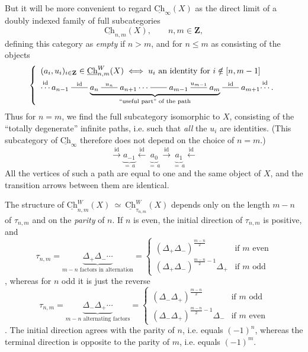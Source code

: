 \documentclass[11pt]{article}
\newcommand{\printedpage}[1]{\marginpar{\footnotesize p.~#1}}
\newcommand{\msp}[1]{\marginpar{\footnotesize [#1]}}
\newcommand{\Ch}{\underline{\mathrm{Ch}}}
\newcommand{\dashto}[1]{\mathrel{\overset{#1}{\rule[0.6ex]{2em}{0.4pt}}}}
\begin{document}
But it will be more convenient to regard $\Ch_{\infty}(X)$ as the direct limit of a
\msp{page 146}
doubly indexed family of full subcategories
\[
\Ch_{n,m}(X), \qquad n, m \in \mathbf{Z},
\]
defining this category as \textit{empty} if $n > m$, and for $n \leq m$ as consisting of the objects
\[
\left\{ \begin{array}{l}
(a_i, u_i)_{i \in \mathbf{Z}} \in \Ch^{W}_{n,m}(X) \iff u_i \text{ an identity for } i \notin [n, m-1] \\[1ex]
\overset{\mathrm{id}}{\cdots}\, a_{n-1} \dashto{\mathrm{id}} \underbrace{a_n \dashto{u_n} a_{n+1} \cdots \dashto{} a_{m-1} \dashto{u_{m-1}} a_m}_{\text{\scriptsize ``useful part'' of the path}} \dashto{\mathrm{id}} a_{m+1} \overset{\mathrm{id}}{\cdots}\,.
\end{array} \right.
\]
Thus for $n = m$, we find the full subcategory isomorphic to $X$, consisting of the ``totally degenerate'' infinite paths, i.e. such that \textit{all} the $u_i$ are identities. (This subcategory of $\Ch_{\infty}$ therefore does not depend on the choice of $n = m$.)
\[
\xrightarrow{\mathrm{id}} \underbrace{a_{-1}}_{=\, a} \xleftarrow{\mathrm{id}} \underbrace{a_0}_{=\, a} \xrightarrow{\mathrm{id}} \underbrace{a_1}_{=\, a} \xleftarrow{\mathrm{id}}
\]
All the vertices of such a path are equal to one and the same object of $X$, and the transition arrows between them are identical.

The structure of $\Ch^{W}_{n,m}(X) \ \simeq \ \Ch^{W}_{\tau_{n,m}}(X)$ depends only on the length $m-n$ of $\tau_{n,m}$ and on the \textit{parity} of $n$. If $n$ is even, the initial direction of $\tau_{n,m}$ is positive, and
\[
\tau_{n,m} = \underbrace{\Delta_+ \Delta_- \cdots}_{m-n \text{ factors in alternation}} = \left\{ \begin{array}{ll}
(\Delta_+ \Delta_-)^{\frac{m-n}{2}} & \text{if } m \text{ even} \\[1ex]
(\Delta_+ \Delta_-)^{\frac{m-n}{2}-1} \Delta_+ & \text{if } m \text{ odd}
\end{array} \right.
\]
, whereas for $n$ odd it is just the reverse
\printedpage{92}
\msp{page 147}
\[
\tau_{n,m} = \underbrace{\Delta_- \Delta_+ \cdots}_{m-n \text{ alternating factors}} = \left\{ \begin{array}{ll}
(\Delta_- \Delta_+)^{\frac{m-n}{2}} & \text{if } m \text{ odd} \\[1ex]
(\Delta_- \Delta_+)^{\frac{m-n}{2}-1} \Delta_- & \text{if } m \text{ even}
\end{array} \right.
\]
. The initial direction agrees with the parity of $n$, i.e. equals $(-1)^n$, whereas the terminal direction is opposite to the parity of $m$, i.e. equals $(-1)^m$.
\end{document}
